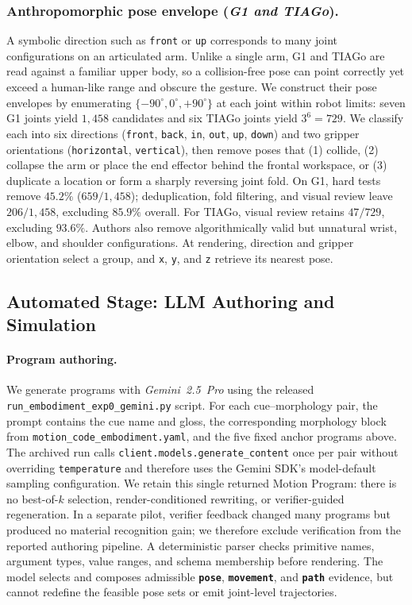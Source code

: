 \documentclass[letterpaper,10pt,conference]{ieeeconf}
\newcommand{\posecolor}[1]{\texttt{\textbf{\textcolor{PoseColor}{#1}}}}
\newcommand{\movecolor}[1]{\texttt{\textbf{\textcolor{MoveColor}{#1}}}}
\newcommand{\pathcolor}[1]{\texttt{\textbf{\textcolor{PathColor}{#1}}}}
\newcommand{\method}{Motion Program}
\begin{document}
\subsubsection{Anthropomorphic pose envelope (\textit{G1 and TIAGo}).}
A symbolic direction such as \texttt{front} or \texttt{up} corresponds to many joint configurations on an articulated arm.
Unlike a single arm, G1 and TIAGo are read against a familiar upper body, so a collision-free pose can point correctly yet exceed a human-like range and obscure the gesture.
We construct their pose envelopes by enumerating $\{-90^{\circ},0^{\circ},+90^{\circ}\}$ at each joint within robot limits: seven G1 joints yield $1{,}458$ candidates and six TIAGo joints yield $3^6=729$.
We classify each into six directions (\texttt{front}, \texttt{back}, \texttt{in}, \texttt{out}, \texttt{up}, \texttt{down}) and two gripper orientations (\texttt{horizontal}, \texttt{vertical}), then remove poses that (1) collide, (2) collapse the arm or place the end effector behind the frontal workspace, or (3) duplicate a location or form a sharply reversing joint fold.
On G1, hard tests remove $45.2\%$ ($659/1{,}458$); deduplication, fold filtering, and visual review leave $206/1{,}458$, excluding $85.9\%$ overall.
For TIAGo, visual review retains $47/729$, excluding $93.6\%$.
Authors also remove algorithmically valid but unnatural wrist, elbow, and shoulder configurations.
At rendering, direction and gripper orientation select a group, and \texttt{x}, \texttt{y}, and \texttt{z} retrieve its nearest pose.

\subsection{Automated Stage: LLM Authoring and Simulation}
\paragraph{Program authoring.}
We generate programs with \textit{Gemini~2.5~Pro} using the released \texttt{run\_embodiment\_exp0\_gemini.py} script.
For each cue--morphology pair, the prompt contains the cue name and gloss, the corresponding morphology block from \texttt{motion\_code\_embodiment.yaml}, and the five fixed anchor programs above.
The archived run calls \texttt{client.models.generate\_content} once per pair without overriding \texttt{temperature} and therefore uses the Gemini SDK's model-default sampling configuration.
We retain this single returned \method{}: there is no best-of-$k$ selection, render-conditioned rewriting, or verifier-guided regeneration.
In a separate pilot, verifier feedback changed many programs but produced no material recognition gain; we therefore exclude verification from the reported authoring pipeline.
A deterministic parser checks primitive names, argument types, value ranges, and schema membership before rendering.
The model selects and composes admissible \posecolor{pose}, \movecolor{movement}, and \pathcolor{path} evidence, but cannot redefine the feasible pose sets or emit joint-level trajectories.
\end{document}

